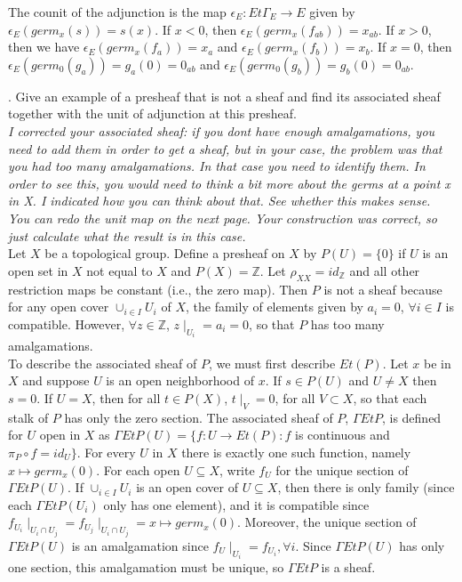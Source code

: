 The counit of the adjunction is the map $\epsilon_E: Et \Gamma_E \rightarrow E$ given by $\epsilon_E(germ_x(s))=s(x)$. If $x <0$, then $\epsilon_E(germ_x(f_{ab}))=x_{ab}$. If $x>0$, then we have $\epsilon_E(germ_x(f_a))=x_a$ and $\epsilon_E(germ_x(f_b))=x_b$. If $x=0$, then $\epsilon_E(germ_0(g_a))=g_a(0)=0_{ab}$ and $\epsilon_E(germ_0(g_b))=g_b(0)=0_{ab}$.


.  Give an example of a presheaf that is not a sheaf and find its associated sheaf together with the unit of adjunction at this presheaf.\\


\textit{I corrected your associated sheaf: if you dont have enough amalgamations, you need to add them in order to get a sheaf, but in your case, the problem was that you had too many amalgamations. In that case you need to identify them. In order to see this, you would need to think a bit more about the germs at a point x in X. I indicated how you can think about that. See whether this makes sense. You can redo the unit map on the next page. Your construction was correct, so just calculate what the result is in this case.}\\


Let $X$ be a topological group. Define a presheaf on $X$ by $P(U)=\{0\}$ if $U$ is an open set in $X$ not equal to $X$ and $P(X) = \mathbb{Z}$. Let $\rho_{XX} = id_\mathbb{Z}$ and all other restriction maps be constant (i.e., the zero map). Then $P$ is not a sheaf because for any open cover $\cup_{i \in I} U_i$ of $X$, the family of elements given by $a_i =0$, $\forall i \in I$ is compatible. However, $\forall z \in \mathbb{Z}$, $z \mid_{U_i} = a_i =0$, so that $P$ has too many amalgamations.\\

To describe the associated sheaf of $P$, we must first describe $Et(P)$. Let $x$ be in $X$ and suppose $U$ is an open neighborhood of $x$. If $s \in P(U)$ and $U \neq X$ then $s=0$. If $U = X$, then for all $t \in P(X)$, $t\mid_V = 0$, for all $V \subset X$, so that each stalk of $P$ has only the zero section. The associated sheaf of $P$, $\Gamma Et P$, is defined for $U$ open in $X$ as $\Gamma EtP (U) = \{f: U \rightarrow Et(P): f$ is continuous and $\pi_P \circ f = id_U\}$. For every $U$ in $X$ there is exactly one such function, namely $x \mapsto germ_x(0)$. For each open $U \subseteq X$, write $f_U$ for the unique section of $\Gamma EtP(U)$. If $\cup_{i \in I} U_i$ is an open cover of $U \subseteq X$, then there is only family (since each $\Gamma EtP(U_i)$ only has one element), and it is compatible since $f_{U_i}\mid_{U_i \cap U_j} = f_{U_j}\mid_{U_i \cap U_j} =x \mapsto germ_x(0)$. Moreover, the unique section of $\Gamma EtP(U)$ is an amalgamation since $f_U\mid_{U_i} = f_{U_i}, \forall i$. Since $\Gamma EtP(U)$ has only one section, this amalgamation must be unique, so $\Gamma EtP$ is a sheaf.\\

